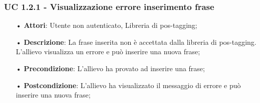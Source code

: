 \subsubsection{UC 1.2.1 - Visualizzazione errore inserimento frase}
\begin{itemize}
\item[•]\textbf{Attori}: Utente non autenticato, Libreria di pos-tagging;
\item[•]\textbf{Descrizione}: La frase inserita non è accettata dalla libreria di pos-tagging. L'allievo visualizza un errore e può inserire una nuova frase;
\item[•]\textbf{Precondizione}: L’allievo ha provato ad inserire una frase;
\item[•]\textbf{Postcondizione}: L’allievo ha visualizzato il messaggio di errore e può inserire una nuova frase;
\end{itemize}
